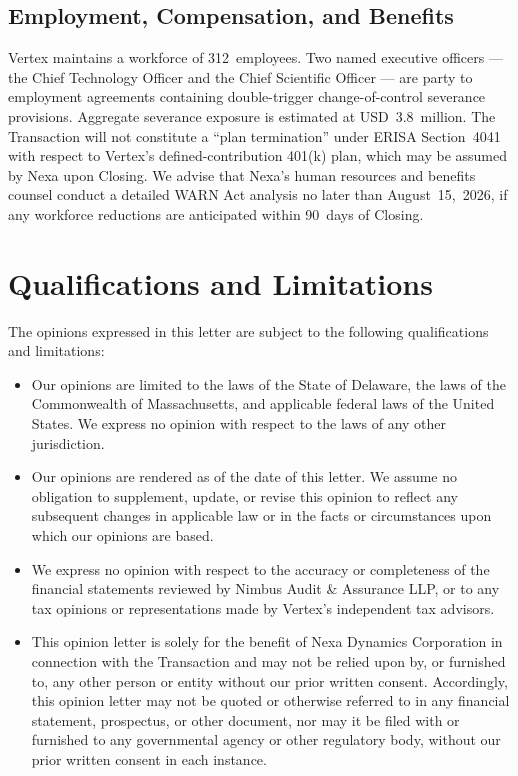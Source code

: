 \documentclass[11pt,a4paper]{scrartcl}
\begin{document}
\vspace{4pt}

\subsection{Employment, Compensation, and Benefits}

Vertex maintains a workforce of 312~employees. Two named executive officers --- the Chief
Technology Officer and the Chief Scientific Officer --- are party to employment agreements
containing double-trigger change-of-control severance provisions. Aggregate severance
exposure is estimated at USD~3.8~million. The Transaction will not constitute a ``plan
termination'' under ERISA Section~4041 with respect to Vertex's defined-contribution
401(k) plan, which may be assumed by Nexa upon Closing. We advise that Nexa's human
resources and benefits counsel conduct a detailed WARN Act analysis no later than
August~15,~2026, if any workforce reductions are anticipated within 90~days of Closing.

\section{Qualifications and Limitations}

The opinions expressed in this letter are subject to the following qualifications and limitations:

\begin{itemize}
  \item Our opinions are limited to the laws of the State of Delaware, the laws of the
    Commonwealth of Massachusetts, and applicable federal laws of the United States. We express
    no opinion with respect to the laws of any other jurisdiction.

  \item Our opinions are rendered as of the date of this letter. We assume no obligation to
    supplement, update, or revise this opinion to reflect any subsequent changes in applicable
    law or in the facts or circumstances upon which our opinions are based.

  \item We express no opinion with respect to the accuracy or completeness of the financial
    statements reviewed by Nimbus Audit \& Assurance LLP, or to any tax opinions or
    representations made by Vertex's independent tax advisors.

  \item This opinion letter is solely for the benefit of Nexa Dynamics Corporation in connection
    with the Transaction and may not be relied upon by, or furnished to, any other person or
    entity without our prior written consent. Accordingly, this opinion letter may not be quoted
    or otherwise referred to in any financial statement, prospectus, or other document, nor may
    it be filed with or furnished to any governmental agency or other regulatory body, without
    our prior written consent in each instance.
\end{itemize}
\end{document}
